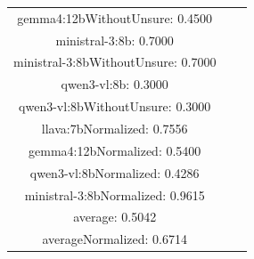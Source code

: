 \documentclass[a4paper]{article}
\begin{document}
\begin{tabular}{ccc}
gemma4:12bWithoutUnsure: 0.4500 \\ ministral-3:8b: 0.7000 \\ ministral-3:8bWithoutUnsure: 0.7000 \\ qwen3-vl:8b: 0.3000 \\ qwen3-vl:8bWithoutUnsure: 0.3000 \\ llava:7bNormalized: 0.7556 \\ gemma4:12bNormalized: 0.5400 \\ qwen3-vl:8bNormalized: 0.4286 \\ ministral-3:8bNormalized: 0.9615 \\ average: 0.5042 \\ averageNormalized: 0.6714 \end{minipage}\\
\end{tabular}

\vspace{5mm}
\end{document}
